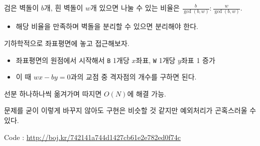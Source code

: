 \documentclass[hyperref={unicode}]{beamer}
\begin{document}
 
    \begin{frame}
         검은 벽돌이 $ b $개, 흰 벽돌이 $ w $개 있으면 나눌 수 있는 비율은 $ \frac{b}{\gcd(b, w)} : \frac{w}{\gcd(b, w)} $.
        \begin{itemize}
        \item<2> 해당 비율을 만족하며 벽돌을 분리할 수 있으면 분리해야 한다.
        \end{itemize}
    \end{frame}
    
    \begin{frame}
         기하학적으로 좌표평면에 놓고 접근해보자.
        \begin{itemize}
            \item<2-> 좌표평면의 원점에서 시작해서 \texttt{B} 1개당 $ x $좌표, \texttt{W} 1개당 $ y $좌표 1 증가
            \item<3-> 이 때 $ wx - by = 0 $과의 교점 중 격자점의 개수를 구하면 된다.
        \end{itemize}
         선분 하나하나씩 옮겨가며 따지면 $ O(N) $에 해결 가능.
        
         문제를 굳이 이렇게 바꾸지 않아도 구현은 비슷할 것 같지만 예외처리가 곤혹스러울 수 있다.
    \end{frame}

    \begin{frame}
        Code : \url{http://boj.kr/742141a744d1427cb61e2e782ed0f74c}
    \end{frame}
\end{document}
